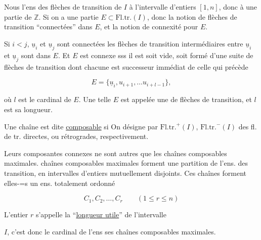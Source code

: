 Nous  l'ens des flèches de transition  de $I$ à l'intervalle d'entiers $[1,n]$, donc à une partie de $\mathbb{Z}$. Si on a une partie $E\subset\mathrm{Fl.tr.}(I)$,   donc  la notion de flèches de transition ``connectées'' dans $E$, et la notion de connexité pour $E$.

Si $i<j$, $\underline{u}_i$ et $\underline{u}_j$ sont connectées   les flèches de transition intermédiaires entre $\underline{u}_i$ et $\underline{u}_j$ sont dans $E$. Et $E$ est connexe sss il est soit vide, soit formé d'une suite de flèches de transition dont chacune est successeur immédiat de celle qui  précède

\[E=\{\underline{u}_i,u_{i+1},\ldots u_{i+l-1}\},\]

où $l$ est le cardinal de $E$. Une telle $E$ est appelée une \uline{} de flèches de transition, et $l$ est sa longueur.

Une chaîne est dite \uline{composable} si     On désigne par $\mathrm{Fl.tr.}^{+}(I)$, $\mathrm{Fl.tr.}^{-}(I)$   des fl. de tr. directes, ou rétrogrades, respectivement.

Leurs  composantes connexes ne sont autres que les chaînes composables maximales.    chaînes composables maximales forment une partition de l'ens. des    transition, en intervalles d'entiers mutuellement disjoints. Ces chaînes forment elles-$\mathord{=}$s un ens. totalement ordonné

\[C_1,C_2,\ldots,C_r\qquad(1\leq r\leq n)\]

L'entier $r$ s'appelle la ``\uline{longueur utile}'' de l'intervalle



$I$, c'est donc le cardinal de l'ens  ses chaînes composables maximales.

